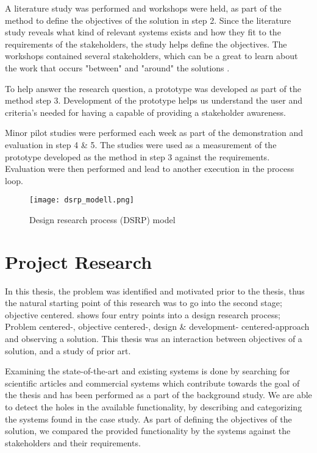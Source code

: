A literature study was performed and workshops were held, as part of the 
method to define the objectives of the solution in step 2. Since the literature study 
reveals what kind of relevant systems exists and how they fit to the
requirements of the stakeholders, the study helps define the objectives. The
workshops contained several stakeholders, which can be a great to learn about
the work that occurs "between" and "around" the solutions
\cite{FocusGroupstoStudyWorkPractice}.

To help answer the research question, a prototype was developed as part of the 
method step 3. Development of the prototype helps us understand the user 
and criteria's needed for having a capable of providing a stakeholder 
awareness.

Minor pilot studies were performed each week as part of the demonstration and
evaluation in step 4 \& 5. The studies were used as a measurement of the prototype developed
as the method in step 3 against the requirements. Evaluation were then
performed and lead to another execution in the process loop.

\begin{figure}[!htbp]
	\texttt{[image: dsrp\_modell.png]}
	\caption[Design science research process (DSRP) model]{Design research process (DSRP)
	model\cite{peffers2006design}}
	\label{fig:DSRP}
\end{figure}



\section{Project Research} %
\label{sec:workshops}
In this thesis, the problem was 
identified and motivated prior to the thesis, thus the natural starting 
point of this research was to go into the second stage; objective 
centered.  shows four entry points into a design 
research process; Problem centered-, objective centered-, design \& development-
centered-approach and observing a solution. This thesis was an interaction 
between objectives of a solution, and a study of prior art.

Examining the state-of-the-art and existing systems is done by searching for
scientific articles and commercial systems which contribute towards the goal 
of the thesis and has been performed as a part of the background study.
We are able to detect the holes in the available functionality, by describing
and categorizing the systems found in the case study. As part of defining the
objectives of the solution, we compared the provided functionality by the
systems against the stakeholders and their requirements.\\

